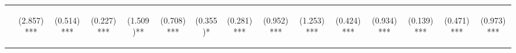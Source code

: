 \begin{center}
\begin{tabular}{lcccccccccccccc}
\hline  & \begin{normalsize}(2.857)***\end{normalsize} & \begin{normalsize}(0.514)***\end{normalsize} & \begin{normalsize}(0.227)***\end{normalsize} & \begin{normalsize}(1.509)**\end{normalsize} & \begin{normalsize}(0.708)***\end{normalsize} & \begin{normalsize}(0.355)*\end{normalsize} & \begin{normalsize}(0.281)***\end{normalsize} & \begin{normalsize}(0.952)***\end{normalsize} & \begin{normalsize}(1.253)***\end{normalsize} & \begin{normalsize}(0.424)***\end{normalsize} & \begin{normalsize}(0.934)***\end{normalsize} & \begin{normalsize}(0.139)***\end{normalsize} & \begin{normalsize}(0.471)***\end{normalsize} & \begin{normalsize}(0.973)***\end{normalsize}\\

\end{tabular}
\end{center}
